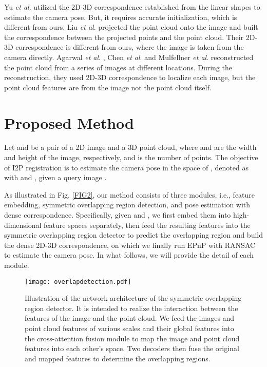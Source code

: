 \documentclass[lettersize,journal]{IEEEtran}
\begin{document}
Yu \textit{et al}. \cite{2D3DCORR} utilized the 2D-3D correspondence established from the linear shapes to estimate the camera pose. But, it requires accurate initialization, which is different from ours. Liu \textit{et al}. \cite{2D3DCORR2} projected the point cloud onto the image and built the correspondence between the projected points and the point cloud. Their 2D-3D correspondence is different from ours, where the image is taken from the camera directly. Agarwal \textit{et al}. \cite{SFM}, Chen \textit{et al}. \cite{overtime1} and Mulfellner \textit{et al}. \cite{overtime2} reconstructed the point cloud from a series of images at different locations. During the reconstruction, they used 2D-3D correspondence to localize each image, but the point cloud features are from the image not the point cloud itself. 





\section{Proposed Method}
\label{sec:proposed}





Let  and  be a pair of a 2D image and a 3D point cloud, where  and  are the width and height of the image, respectively, and  is the number of points. The objective of I2P registration is to estimate the camera pose in the space of , denoted as  with  and , given a query image . 

As illustrated in Fig. \ref{FIG2}, our method consists of three modules, i.e., feature embedding, symmetric overlapping region detection, and pose estimation with dense correspondence. Specifically, given  and , we first embed them into high-dimensional feature spaces separately, then feed the resulting features into the symmetric overlapping region detector to predict the overlapping region and build the dense 2D-3D correspondence, on which we finally run EPnP \cite{EPNP} with RANSAC \cite{RANSAC} to estimate the camera pose. In what follows, we will provide the detail of each module.

\begin{figure*}
\texttt{[image: overlapdetection.pdf]}
\caption{Illustration of the network architecture of the symmetric overlapping region detector. 
It is intended to realize the interaction between the features of the image and the point cloud. We feed the images and point cloud features of various scales and their global features into the cross-attention fusion module to map the image and point cloud features into each other's space.  Two decoders then fuse the original and mapped features to determine the overlapping regions.}

\label{FIG3}
\end{figure*}
\end{document}
